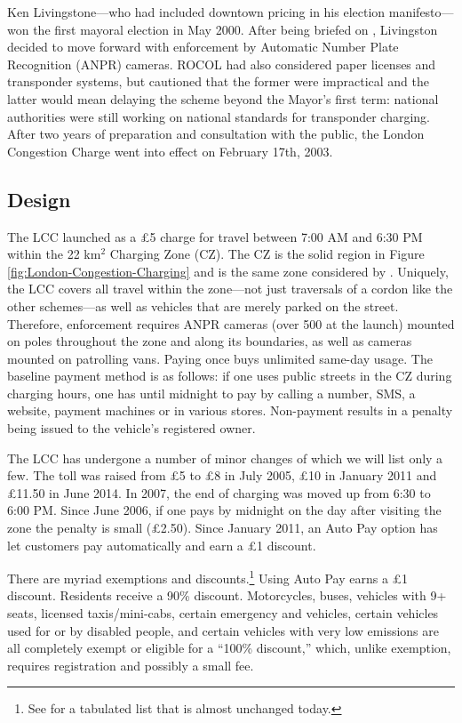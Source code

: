 Ken Livingstone---who had included downtown pricing in his election manifesto---won the first mayoral election in May 2000. After being briefed on \citet{ROCOL2000}, Livingston decided to move forward with enforcement by Automatic Number Plate Recognition (ANPR) cameras. ROCOL had also considered paper licenses and transponder systems, but cautioned that the former were impractical and the latter would mean delaying the scheme beyond the Mayor's first term: national authorities were still working on national standards for transponder charging. After two years of preparation and consultation with the public, the London Congestion Charge went into effect on February 17th, 2003.

\subsection{Design}

The LCC launched as a \pounds5 charge for travel between 7:00 AM and 6:30 PM within the 22 km$^{2}$ Charging Zone (CZ). The CZ is the solid region in Figure \ref{fig:London-Congestion-Charging} and is the same zone considered by \citet{Thomson1967a}. Uniquely, the LCC covers all travel within the zone---not just traversals of a cordon like the other schemes---as well as vehicles that are merely parked on the street. Therefore, enforcement requires ANPR cameras (over 500 at the launch) mounted on poles throughout the zone and along its boundaries, as well as cameras mounted on patrolling vans. Paying once buys unlimited same-day usage. The baseline payment method is as follows: if one uses public streets in the CZ during charging hours, one has until midnight to pay by calling a number, SMS, a website, payment machines or in various stores. Non-payment results in a penalty being issued to the vehicle's registered owner.

The LCC has undergone a number of minor changes of which we will list only a few. The toll was raised from \pounds5 to \pounds8 in July 2005, \pounds10 in January 2011 and \pounds11.50 in June 2014. In 2007, the end of charging was moved up from 6:30 to 6:00 PM. Since June 2006, if one pays by midnight on the day after visiting the zone the penalty is small (\pounds 2.50). Since January 2011, an Auto Pay option has let customers pay automatically and earn a \pounds 1 discount.

There are myriad exemptions and discounts.\footnote{See \citet[Table 1, p. 515]{Santos2005} for a tabulated list that is almost unchanged today.} Using Auto Pay earns a \pounds1 discount. Residents receive a 90\% discount. Motorcycles, buses, vehicles with 9+ seats, licensed taxis/mini-cabs, certain emergency and vehicles, certain vehicles used for or by  disabled people, and certain vehicles with very low emissions are all completely exempt or eligible for a ``100\% discount,'' which, unlike exemption, requires registration and possibly a small fee.

